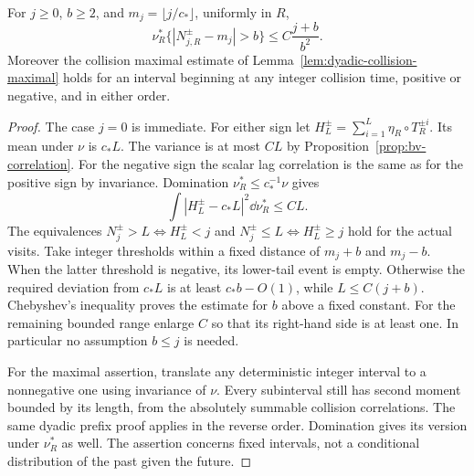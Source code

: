 \begin{lemma}
\label{lem:two-sided-clock-window}
For $j\ge0$, $b\ge2$, and $m_j=\lfloor j/c_*\rfloor$, uniformly in $R$,
\begin{equation}\label{eq:two-sided-clock-window}
 \nu_R^*\{|N^\pm_{j,R}-m_j|>b\}\le C\frac{j+b}{b^2}.
\end{equation}
Moreover the collision maximal estimate of
Lemma~\ref{lem:dyadic-collision-maximal} holds for an interval beginning
at any integer collision time, positive or negative, and in either order.
\end{lemma}
\begin{proof}
The case $j=0$ is immediate. For either sign let
$H_L^\pm=\sum_{i=1}^L\eta_R\circ T_R^{\pm i}$. Its mean under $\nu$
is $c_*L$. The variance is at most $CL$ by
Proposition~\ref{prop:bv-correlation}. For the negative sign the scalar
lag correlation is the same as for the positive sign by invariance.
Domination $\nu_R^*\le c_*^{-1}\nu$ gives
\[
 \int|H_L^\pm-c_*L|^2\dd\nu_R^*\le CL.
\]
The equivalences $N_j^\pm>L\iff H_L^\pm<j$ and
$N_j^\pm\le L\iff H_L^\pm\ge j$ hold for the actual visits. Take
integer thresholds within a fixed distance of $m_j+b$ and $m_j-b$.
When the latter threshold is negative, its lower-tail event is empty.
Otherwise the required deviation from $c_*L$ is at least $c_*b-O(1)$,
while $L\le C(j+b)$. Chebyshev's inequality proves the estimate for
$b$ above a fixed constant. For the remaining bounded range enlarge $C$
so that its right-hand side is at least one. In particular no assumption
$b\le j$ is needed.

For the maximal assertion, translate any deterministic integer interval
to a nonnegative one using invariance of $\nu$. Every subinterval still
has second moment bounded by its length, from the absolutely summable
collision correlations. The same dyadic prefix proof applies in the
reverse order. Domination gives its version under $\nu_R^*$ as well.
The assertion concerns fixed intervals, not a conditional distribution
of the past given the future.
\end{proof}

